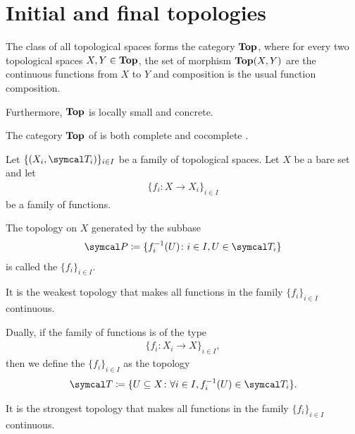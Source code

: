 \section{Initial and final topologies}\label{sec:initial_final_topologies}

\begin{definition}\label{def:category_of_topological_spaces}
  The class of all topological spaces forms the category \( \operatorname{\mathbf{Top}} \), where for every two topological spaces \( X, Y \in \operatorname{\mathbf{Top}} \), the set of morphism \( \operatorname{\mathbf{Top}}(X, Y) \) are the continuous functions from \( X \) to \( Y \) and composition is the usual function composition.

  Furthermore, \( \operatorname{\mathbf{Top}} \) is locally small and concrete.
\end{definition}

\begin{theorem}\label{thm:top_complete_cocomplete}
  The category \( \operatorname{\mathbf{Top}} \) of is both complete  and cocomplete .
\end{theorem}

\begin{definition}\label{def:initial_topology}\cite{nLab:top}
  Let \( \{ (X_i, \Cal{T}_i) \}_{i \in I} \) be a family of topological spaces. Let \( X \) be a bare set and let
  \begin{align*}
    \{ f_i: X \to X_i \}_{i \in I}
  \end{align*}
  be a family of functions.

  The topology on \( X \) generated by the subbase
  \begin{align*}
    \Cal{P} \coloneqq \{ f_i^{-1}(U) \colon i \in I, U \in \Cal{T}_i \}
  \end{align*}
  is called the  \( \{ f_i \}_{i \in I} \).

  It is the weakest topology that makes all functions in the family \( \{ f_i \}_{i \in I} \) continuous.
\end{definition}

\begin{definition}\label{def:final_topology}\cite{nLab:top}
  Dually, if the family of functions is of the type
  \begin{align*}
    \{ f_i: X_i \to X \}_{i \in I},
  \end{align*}
  then we define the  \( \{ f_i \}_{i \in I} \) as the topology
  \begin{align*}
    \Cal{T} \coloneqq \{ U \subseteq X \colon \forall i \in I, f_i^{-1}(U) \in \Cal{T}_i \}.
  \end{align*}

  It is the strongest topology that makes all functions in the family \( \{ f_i \}_{i \in I} \) continuous.
\end{definition}

